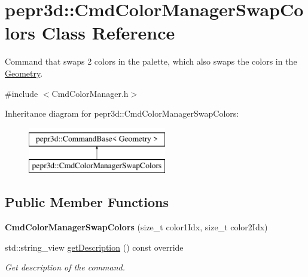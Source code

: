 \hypertarget{classpepr3d_1_1_cmd_color_manager_swap_colors}{}\section{pepr3d\+::Cmd\+Color\+Manager\+Swap\+Colors Class Reference}
\label{classpepr3d_1_1_cmd_color_manager_swap_colors}


Command that swaps 2 colors in the palette, which also swaps the colors in the \mbox{\hyperlink{classpepr3d_1_1_geometry}{Geometry}}.  




{\ttfamily \#include $<$Cmd\+Color\+Manager.\+h$>$}

Inheritance diagram for pepr3d\+::Cmd\+Color\+Manager\+Swap\+Colors\+:\begin{figure}[H]
\begin{center}
\leavevmode
\includegraphics[height=2.000000cm]{classpepr3d_1_1_cmd_color_manager_swap_colors}
\end{center}
\end{figure}
\subsection*{Public Member Functions}
\begin{DoxyCompactItemize}
\item 
\mbox{\label{classpepr3d_1_1_cmd_color_manager_swap_colors_af6dc11ce3593fe744de4227aedc03239}} 
{\bfseries Cmd\+Color\+Manager\+Swap\+Colors} (size\+\_\+t color1\+Idx, size\+\_\+t color2\+Idx)
\item 
\mbox{\label{classpepr3d_1_1_cmd_color_manager_swap_colors_abec8b759af2a20f032491ec55a6e36a4}} 
std\+::string\+\_\+view \mbox{\hyperlink{classpepr3d_1_1_cmd_color_manager_swap_colors_abec8b759af2a20f032491ec55a6e36a4}{get\+Description}} () const override
\begin{DoxyCompactList}\small\item\em Get description of the command. \end{DoxyCompactList}\end{DoxyCompactItemize}
